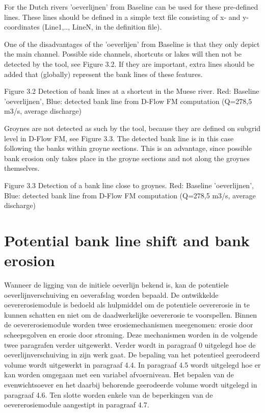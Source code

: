 For the Dutch rivers 'oeverlijnen' from Baseline can be used for these pre-defined lines.
These lines should be defined in a simple text file consisting of x- and y- coordinates (Line1,.., LineN, in the definition file).


One of the disadvantages of the 'oeverlijen' from Baseline is that they only depict the main channel.
Possible side channels, shortcuts or lakes will then not be detected by the tool, see
Figure 3.2.
If they are important, extra lines should be added that (globally) represent the bank lines of these features.


Figure 3.2 Detection of bank lines at a shortcut in the Muese river.
Red: Baseline 'oeverlijnen', Blue: detected bank line from D-Flow FM computation (Q=278,5 m3/s, average discharge)

Groynes are not detected as such by the tool, because they are defined on subgrid level in D-Flow FM, see Figure 3.3.
The detected bank line is in this case following the banks within groyne sections.
This is an advantage, since possible bank erosion only takes place in the groyne sections and not along the groynes themselves.

Figure 3.3 Detection of a bank line close to groynes.
Red: Baseline 'oeverlijnen', Blue: detected bank line from D-Flow FM computation (Q=278,5 m3/s, average discharge)


\chapter{Potential bank line shift and bank erosion}

Wanneer de ligging van de initiele oeverlijn bekend is, kan de potentiele oeverlijnverschuiving en oeverafslag worden bepaald.
De ontwikkelde oevererosiemodule is bedoeld als hulpmiddel om de potentiele oevererosie in te kunnen schatten en niet om de daadwerkelijke oevererosie te voorspellen.
Binnen de oevererosiemodule worden twee erosiemechanismen meegenomen: erosie door scheepsgolven en erosie door stroming.
Deze mechanismen worden in de volgende twee paragrafen verder uitgewerkt.
Verder wordt in paragraaf 0 uitgelegd hoe de oeverlijnverschuiving in zijn werk gaat.
De bepaling van het potentieel geerodeerd volume wordt uitgewerkt in paragraaf 4.4.
In paragraaf 4.5 wordt uitgelegd hoe er kan worden omgegaan met een variabel afvoerniveau.
Het bepalen van de evenwichtsoever en het daarbij behorende geerodeerde volume wordt uitgelegd in paragraaf 4.6.
Ten slotte worden enkele van de beperkingen van de oevererosiemodule aangestipt in paragraaf 4.7.


